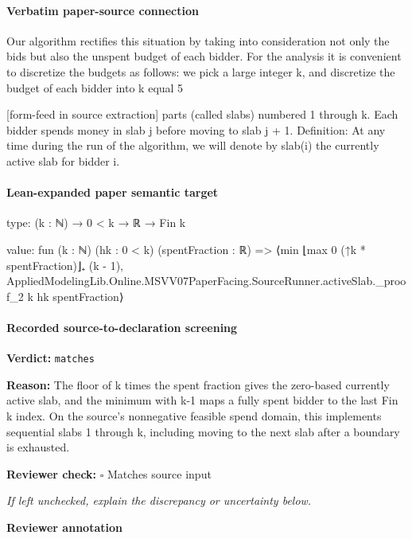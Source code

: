 \documentclass[10pt]{article}
\newcommand{\reviewerbox}{%
  \par\noindent\fbox{\parbox{0.96\linewidth}{\rule{0pt}{0.38in}}}\par
}
\newcommand{\reviewmatch}[1]{%
  \par\noindent\textbf{Reviewer check:} $\square$\; #1\par
  \noindent\emph{If left unchecked, explain the discrepancy or uncertainty below.}\par
}
\begin{document}
\paragraph{Verbatim paper-source connection}
\begin{ReviewVerbatim}
Our algorithm rectifies this situation by taking into consideration not only the bids but also
the unspent budget of each bidder. For the analysis it is convenient to discretize the budgets
as follows: we pick a large integer k, and discretize the budget of each bidder into k equal
5


[form-feed in source extraction]
parts (called slabs) numbered 1 through k. Each bidder spends money in slab j before moving
to slab j + 1.
Definition: At any time during the run of the algorithm, we will denote by slab(i) the
currently active slab for bidder i.
\end{ReviewVerbatim}



\paragraph{Lean-expanded paper semantic target}
\begin{ReviewVerbatim}
type:
(k : ℕ) → 0 < k → ℝ → Fin k

value:
fun (k : ℕ) (hk : 0 < k) (spentFraction : ℝ) =>
  ⟨min ⌊max 0 (↑k * spentFraction)⌋₊ (k - 1),
    AppliedModelingLib.Online.MSVV07PaperFacing.SourceRunner.activeSlab._proof_2 k hk spentFraction⟩
\end{ReviewVerbatim}


\paragraph{Recorded source-to-declaration screening}
\textbf{Verdict:} \texttt{matches}
\\
{\raggedright
\textbf{Reason:} The floor of k times the spent fraction gives the zero-\allowbreak{}based currently active slab, and the minimum with k-\allowbreak{}1 maps a fully spent bidder to the last Fin k index.\allowbreak{} On the source's nonnegative feasible spend domain, this implements sequential slabs 1 through k, including moving to the next slab after a boundary is exhausted.\allowbreak{}
\par}
\reviewmatch{Matches source input}
\noindent\textbf{Reviewer annotation}\par
\reviewerbox
\clearpage
\hypertarget{paper-prerequisite-84b93a2351446dd2}{}
\end{document}

